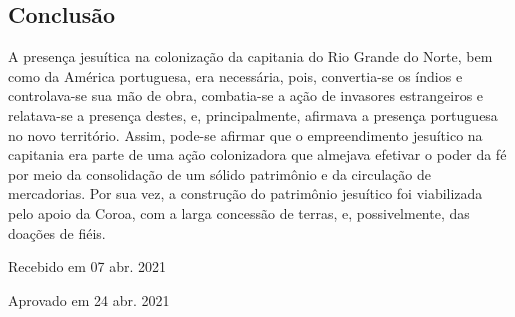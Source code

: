\begin{refsection}
\section{Conclusão}

A presença jesuítica na colonização da capitania do Rio Grande do Norte, bem como da América portuguesa, era necessária, pois, convertia-se os índios e controlava-se sua mão de obra, combatia-se a ação de invasores estrangeiros e relatava-se a presença destes, e, principalmente, afirmava a presença portuguesa no novo território. Assim, pode-se afirmar que o empreendimento jesuítico na capitania era parte de uma ação colonizadora que almejava efetivar o poder da fé por meio da consolidação de um sólido patrimônio e da circulação de mercadorias. Por sua vez, a construção do patrimônio jesuítico foi viabilizada pelo apoio da Coroa, com a larga concessão de terras, e, possivelmente, das doações de fiéis.

\printbibliography[heading=subbibliography,notcategory=fullcited]

\hfill Recebido em 07 abr. 2021

\hfill Aprovado em 24 abr. 2021

\label{chap:patrimonioend}

\end{refsection}
